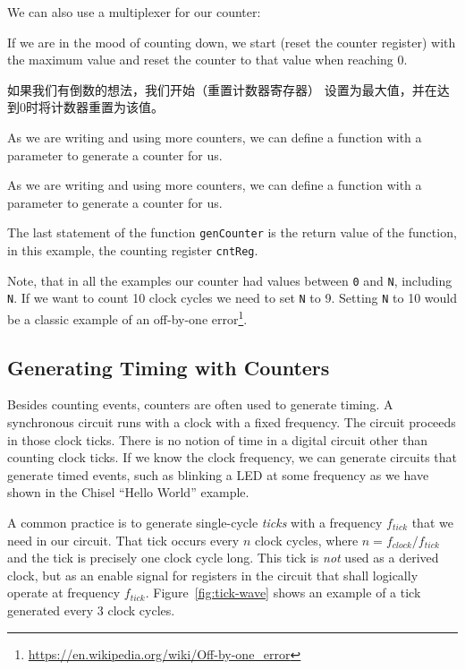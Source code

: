 \documentclass[%
    10pt,
    headinclude, footexclude,
    openright, %
    notitlepage,
    cleardoubleempty,
    headsepline,
    pointlessnumbers,
    bibtotoc, idxtotoc,
    ]{scrbook}
\newcommand{\code}[1]{{\small{\texttt{#1}}}}
\newcommand{\myref}[2]{\href{#1}{#2}}
\renewcommand{\myref}[2]{{#2}{\footnote{\url{#1}}}}
\begin{document}

\noindent We can also use a multiplexer for our counter:


\noindent If we are in the mood of counting down, we start (reset the counter register)
with the maximum value and reset the counter to that value when reaching 0.


如果我们有倒数的想法，我们开始（重置计数器寄存器）
设置为最大值，并在达到0时将计数器重置为该值。


\noindent As we are writing and using more counters, we can
define a function with a parameter to generate a counter for us.

As we are writing and using more counters, we can
define a function with a parameter to generate a counter for us.



\noindent The last statement of the function \code{genCounter} is the return
value of the function, in this example, the counting register \code{cntReg}.

Note, that in all the examples our counter had values between \code{0} and
\code{N}, including \code{N}. If we want to count 10 clock cycles we need
to set \code{N} to 9. Setting \code{N} to 10 would be a classic example of an
\myref{https://en.wikipedia.org/wiki/Off-by-one_error}{off-by-one error}.

\subsection{Generating Timing with Counters}

Besides counting events, counters are often used to generate timing.
A synchronous circuit runs with a clock with a fixed frequency.
The circuit proceeds in those clock ticks. There is no notion of time in a digital
circuit other than counting clock ticks. If we know the clock frequency, we
can generate circuits that generate timed events, such as blinking a LED
at some frequency as we have shown in the Chisel ``Hello World'' example.

A common practice is to generate single-cycle \emph{ticks} with a frequency $f_{tick}$
that we need in our circuit. That tick occurs every $n$ clock cycles,
where $n = f_{clock}/f_{tick}$ and the tick is precisely one clock cycle long.
This tick is \emph{not} used as a derived clock, but as an enable signal for
registers in the circuit that shall logically operate at frequency $f_{tick}$.
Figure~\ref{fig:tick-wave} shows an example of a tick generated every
3 clock cycles.
\end{document}

